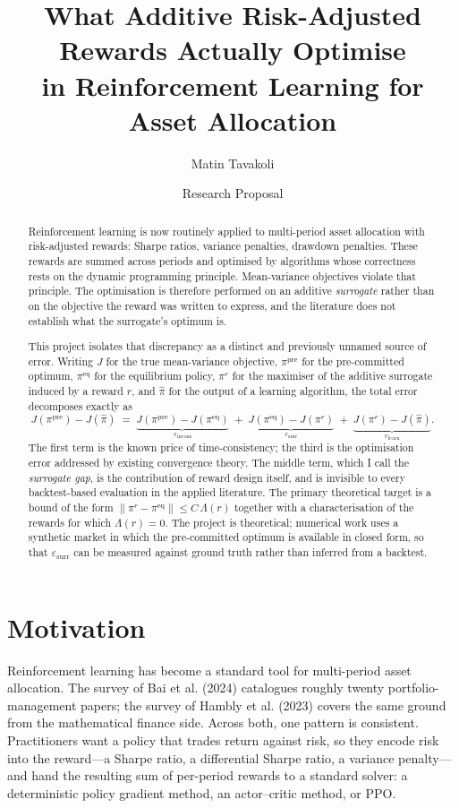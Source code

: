 \documentclass[11pt,a4paper]{article}
\title{\vspace{-1.5em}What Additive Risk-Adjusted Rewards Actually Optimise\\
in Reinforcement Learning for Asset Allocation}
\author{Matin Tavakoli}
\date{Research Proposal}
\theoremstyle{plain}
\theoremstyle{definition}
\newcommand{\pipre}{\pi^{\mathrm{pre}}}
\newcommand{\pieq}{\pi^{\mathrm{eq}}}
\newcommand{\pir}{\pi^{r}}
\newcommand{\pihat}{\widehat{\pi}}
\newcommand{\epsincons}{\varepsilon_{\mathrm{incons}}}
\newcommand{\epssurr}{\varepsilon_{\mathrm{surr}}}
\newcommand{\epslearn}{\varepsilon_{\mathrm{learn}}}
\begin{document}
\maketitle
\vspace{-1.5em}

\begin{abstract}
\noindent
Reinforcement learning is now routinely applied to multi-period asset allocation with
risk-adjusted rewards: Sharpe ratios, variance penalties, drawdown penalties. These
rewards are summed across periods and optimised by algorithms whose correctness rests
on the dynamic programming principle. Mean-variance objectives violate that principle.
The optimisation is therefore performed on an additive \emph{surrogate} rather than on
the objective the reward was written to express, and the literature does not establish
what the surrogate's optimum is.

This project isolates that discrepancy as a distinct and previously unnamed source of
error. Writing $J$ for the true mean-variance objective, $\pipre$ for the pre-committed
optimum, $\pieq$ for the equilibrium policy, $\pir$ for the maximiser of the additive
surrogate induced by a reward $r$, and $\pihat$ for the output of a learning algorithm,
the total error decomposes exactly as
\[
J(\pipre)-J(\pihat) \;=\; \underbrace{J(\pipre)-J(\pieq)}_{\epsincons}
\;+\; \underbrace{J(\pieq)-J(\pir)}_{\epssurr}
\;+\; \underbrace{J(\pir)-J(\pihat)}_{\epslearn}.
\]
The first term is the known price of time-consistency; the third is the optimisation
error addressed by existing convergence theory. The middle term, which I call the
\emph{surrogate gap}, is the contribution of reward design itself, and is invisible to
every backtest-based evaluation in the applied literature. The primary theoretical
target is a bound of the form $\|\pir-\pieq\| \le C\,\Lambda(r)$ together with a
characterisation of the rewards for which $\Lambda(r)=0$. The project is theoretical;
numerical work uses a synthetic market in which the pre-committed optimum is available
in closed form, so that $\epssurr$ can be measured against ground truth rather than
inferred from a backtest.
\end{abstract}

\section{Motivation}

Reinforcement learning has become a standard tool for multi-period asset allocation.
The survey of Bai et al. (2024) catalogues roughly twenty portfolio-management
papers; the survey of Hambly et al. (2023) covers the same ground from the
mathematical finance side. Across both, one pattern is consistent. Practitioners want a
policy that trades return against risk, so they encode risk into the reward---a Sharpe
ratio, a differential Sharpe ratio, a variance penalty---and hand the resulting sum of
per-period rewards to a standard solver: a deterministic policy gradient method, an
actor--critic method, or PPO.
\end{document}
